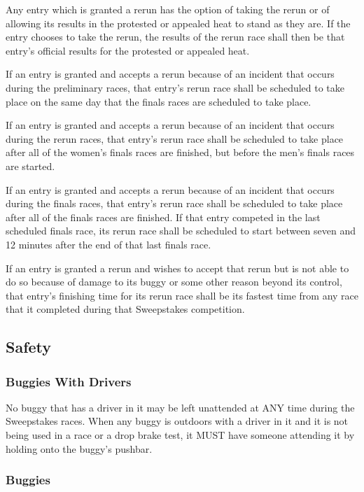 	Any entry which is granted a rerun has the option of taking the rerun or of
	allowing its results in the protested or appealed heat to stand as they are. If
	the entry chooses to take the rerun, the results of the rerun race shall then
	be that entry's official results for the protested or appealed heat.

	If an entry is granted and accepts a rerun because of an incident that occurs
	during the preliminary races, that entry's rerun race shall be scheduled to
	take place on the same day that the finals races are scheduled to take place.

	If an entry is granted and accepts a rerun because of an incident that occurs
	during the rerun races, that entry's rerun race shall be scheduled to take
	place after all of the women's finals races are finished, but before the men's
	finals races are started.

	If an entry is granted and accepts a rerun because of an incident that occurs
	during the finals races, that entry's rerun race shall be scheduled to take
	place after all of the finals races are finished. If that entry competed in the
	last scheduled finals race, its rerun race shall be scheduled to start between
	seven and 12 minutes after the end of that last finals race.

	If an entry is granted a rerun and wishes to accept that rerun but is not able
	to do so because of damage to its buggy or some other reason beyond its
	control, that entry's finishing time for its rerun race shall be its fastest
	time from any race that it completed during that Sweepstakes competition.

\subsection{Safety}

\subsubsection{Buggies With Drivers}

	No buggy that has a driver in it may be left unattended at ANY time during the
	Sweepstakes races. When any buggy is outdoors with a driver in it and it is not
	being used in a race or a drop brake test, it MUST have someone attending it by
	holding onto the buggy's pushbar.

\subsubsection{Buggies}

